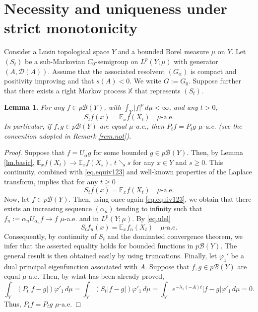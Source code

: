 \documentclass[11pt,a4paper,reqno]{amsart}
\newtheorem{lemma}[theorem]{\bf Lemma}
\theoremstyle{definition}
\numberwithin{equation}{section}
\begin{document}
\section{Necessity and uniqueness under strict monotonicity}
\label{sec8}
Consider a Lusin topological space $Y$  and a bounded Borel measure $\mu$  on $Y$.
Let $(S_t)$ be a sub-Markovian $C_0$-semigroup on  $L^p(Y;\mu)$ with generator $(A,\mathscr D(A))$.
 Assume that  the associated  resolvent  $(G_\alpha)$ is compact and positivity improving and that $s(A)<0$.
We write $G:=G_0$.
Suppose further that  there exists a  right Markov process $\mathbb X$ that represents $(S_t)$.
\begin{lemma}
\label{lm.lm.lm}
For  any  $f\in p\mathcal B(Y)$, with $\int_Y|f|^p\,d\mu<\infty$, 
and any $t>0$,
\[
S_tf(x)=\mathbb E_xf(X_t)\quad\mu\text{-a.e.}
\]
In particular,  if $f,g\in p\mathcal B(Y)$
are equal $\mu$-a.e., then $P_tf=P_tg$ $\mu$-a.e.
(see the convention adopted in Remark  \ref{rem.not}).
\end{lemma}
\begin{proof}
Suppose that $f=U_\alpha g$ for some bounded $g\in p\mathcal B(Y)$.
Then, by Lemma \ref{lm.basic}, $\mathbb E_xf(X_t)\to \mathbb E_xf(X_s),\, t\searrow s$ for any $x\in Y$ and $s\ge 0$.
This continuity, combined with \eqref{eq.equiv123} and well-known properties of the 
Laplace  transform, implies that for any $t\ge 0$
\begin{equation}
\label{eq.ulel}
S_tf(x)=\mathbb E_xf(X_t)\quad\mu\text{-a.e.}
\end{equation}
Now, let $f\in p\mathcal B(Y)$. Then, using once again \eqref{eq.equiv123}, we obtain that there exists 
an increasing  sequence $(\alpha_n)$ tending to infinity such that $f_n:=\alpha_n U_{\alpha_n} f\to f$ $\mu$-a.e. and 
in $L^p(Y;\mu)$. By \eqref{eq.ulel}
\[
S_tf_n(x)=\mathbb E_xf_n(X_t)\quad\mu\text{-a.e.}
\]
Consequently, by continuity of $S_t$ and the  dominated convergence theorem, 
we infer that the asserted equality holds for bounded functions in $p\mathcal B(Y)$. 
The general result is then obtained easily by using truncations. 
Finally, let $\varphi_1'$ be a dual principal eigenfunction  associated with   $A$.  Suppose that 
$f,g\in p\mathcal B(Y)$ are equal $\mu$-a.e. Then, by what has been already proved,
\[
\int_Y (P_t|f-g|)\varphi'_1\,d\mu=\int_Y (S_t|f-g|)\varphi'_1\,d\mu=\int_Y e^{-\lambda_1(-A)t}|f-g|\varphi'_1\,d\mu=0.
\]
Thus, $P_tf=P_tg$ $\mu$-a.e. 
\end{proof}
\end{document}
